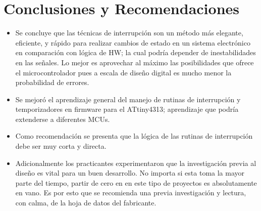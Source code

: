 \section{Conclusiones y Recomendaciones}
\begin{itemize}
\item Se concluye que las técnicas de interrupción son un método más elegante, eficiente, y rápido para realizar cambios de estado en un sistema electrónico en comparación con lógica de HW; la cual podría depender de inestabilidades en las señales. Lo mejor es aprovechar al máximo las posibilidades que ofrece el microcontrolador pues a escala de diseño digital es mucho menor la probabilidad de errores. 
\item Se mejoró el aprendizaje general del manejo de rutinas de interrupción y temporizadores en firmware para el ATtiny4313; aprendizaje que podría extenderse a diferentes MCUs.
\item Como recomendación se presenta que la lógica de las rutinas de interrupción debe ser muy corta y directa. \item Adicionalmente los practicantes experimentaron que la investigación previa al diseño es vital para un buen desarrollo. No importa si esta toma la mayor parte del tiempo, partir de cero en en este tipo de proyectos es absolutamente en vano. Es por esto que se recomienda una previa investigación y lectura, con calma, de la hoja de datos del fabricante.
\end{itemize}